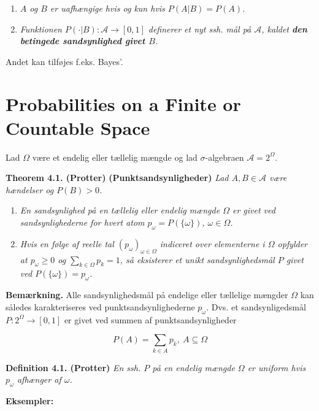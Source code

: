 \documentclass[
]{book}
\providecommand{\tightlist}{%
  \setlength{\itemsep}{0pt}\setlength{\parskip}{0pt}}
\begin{document}
\begin{enumerate}
\def\labelenumi{\alph{enumi}.}
\tightlist
\item
  \emph{\(A\) og \(B\) er uafhængige hvis og kun hvis \(P(A\vert B)=P(A)\).}
\item
  \emph{Funktionen \(P(\cdot \vert B) : \mathcal{A} \to [0,1]\) definerer et nyt ssh. mål på \(\mathcal{A}\), kaldet \textbf{den betingede sandsynlighed givet \(B\)}.}
\end{enumerate}

Andet kan tilføjes f.eks. Bayes'.

\hypertarget{probabilities-on-a-finite-or-countable-space}{%
\section{Probabilities on a Finite or Countable Space}\label{probabilities-on-a-finite-or-countable-space}}

Lad \(\Omega\) være et endelig eller tællelig mængde og lad \(\sigma\)-algebraen \(\mathcal{A}=2^\Omega\).

\textbf{Theorem 4.1. (Protter)} \textbf{(Punktsandsynligheder)} \emph{Lad \(A,B\in\mathcal{A}\) være hændelser og \(P(B)>0\).}

\begin{enumerate}
\def\labelenumi{\alph{enumi}.}
\tightlist
\item
  \emph{En sandsynlighed på en tællelig eller endelig mængde \(\Omega\) er givet ved sandsynlighederne for hvert atom \(p_\omega=P(\{\omega\})\), \(\omega\in\Omega\).}
\item
  \emph{Hvis en følge af reelle tal \((p_\omega)_{\omega\in\Omega}\) indiceret over elementerne i \(\Omega\) opfylder at \(p_\omega\ge0\) og \(\sum_{k\in\Omega}p_k=1\), så eksisterer et unikt sandsynlighedsmål \(P\) givet ved \(P(\{\omega\})=p_\omega\).}
\end{enumerate}

\textbf{Bemærkning.} Alle sandsynlighedsmål på endelige eller tællelige mængder \(\Omega\) kan således karakteriseres ved punktsandsynlighederne \(p_\omega\). Dvs. et sandsynligedsmål \(P : 2^\Omega \to [0,1]\) er givet ved summen af punktsandsynligheder

\[
P(A)=\sum_{k\in A}p_k,\ A\subseteq\Omega
\]

\textbf{Definition 4.1. (Protter)} \emph{En ssh. \(P\) på en endelig mængde \(\Omega\) er uniform hvis \(p_\omega\) afhænger af \(\omega\).}

\textbf{Eksempler:}
\end{document}
